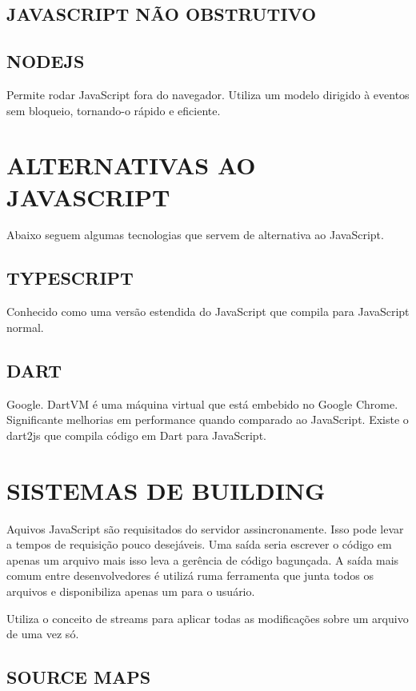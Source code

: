 \documentclass[
12pt,
a4paper,
portuges,
draft
]{report}
\begin{document}
\section{JAVASCRIPT NÃO OBSTRUTIVO}

\section{NODEJS}

Permite rodar JavaScript fora do navegador. Utiliza um modelo dirigido
à eventos sem bloqueio, tornando-o rápido e eficiente.

\chapter{ALTERNATIVAS AO JAVASCRIPT}

Abaixo seguem algumas tecnologias que servem de alternativa ao
JavaScript.

\section{TYPESCRIPT}

Conhecido como uma versão estendida do JavaScript que compila para
JavaScript normal.

\section{DART}

Google. DartVM é uma máquina virtual que está embebido no Google
Chrome. Significante melhorias em performance quando comparado
ao JavaScript. Existe o dart2js que compila código em Dart para
JavaScript.

\chapter{SISTEMAS DE BUILDING}

Aquivos JavaScript são requisitados do servidor assincronamente. Isso
pode levar a tempos de requisição pouco desejáveis. Uma saída seria
escrever o código em apenas um arquivo mais isso leva a gerência de
código bagunçada. A saída mais comum entre desenvolvedores é utilizá
ruma ferramenta que junta todos os arquivos e disponibiliza apenas um
para o usuário.

Utiliza o conceito de streams para aplicar todas as modificações sobre
um arquivo de uma vez só.

\section{SOURCE MAPS}
\end{document}
